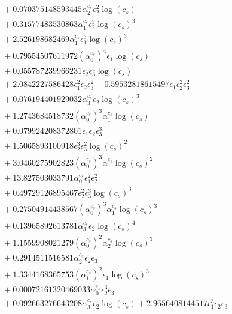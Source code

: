 \documentclass[10pt]{article}
\begin{document}
\begin{align*}
&{}  + 0.070375148593445 \alpha_{2}^{c_s} \epsilon_{2}^{2} \log{\left(c_{s} \right)} \\
&{}  + 0.31577483530863 \alpha_{1}^{c_s} \epsilon_{2}^{3} \log{\left(c_{s} \right)}^{3} \\
&{}  + 2.526198682469 \alpha_{1}^{c_s} \epsilon_{1}^{3} \log{\left(c_{s} \right)}^{3} \\
&{}  + 0.79554507611972 \left(\alpha_{0}^{c_s}\right)^{4} \epsilon_{1} \log{\left(c_{s} \right)} \\
&{}  + 0.055787239966231 \epsilon_{2} \epsilon_{3}^{4} \log{\left(c_{s} \right)} \\
&{}  + 2.0842227586428 \epsilon_{1}^{2} \epsilon_{2} \epsilon_{3}^{2} + 0.59532818615497 \epsilon_{1} \epsilon_{2}^{2} \epsilon_{3}^{2} \\
&{}  + 0.076194401929032 \alpha_{3}^{c_s} \epsilon_{2} \log{\left(c_{s} \right)}^{3} \\
&{}  + 1.2743684518732 \left(\alpha_{0}^{c_s}\right)^{3} \alpha_{1}^{c_s} \log{\left(c_{s} \right)} \\
&{}  + 0.079924208372801 \epsilon_{1} \epsilon_{2} \epsilon_{3}^{3} \\
&{}  + 1.5065893100918 \epsilon_{2}^{3} \epsilon_{3}^{2} \log{\left(c_{s} \right)}^{2} \\
&{}  + 3.0460275902823 \left(\alpha_{0}^{c_s}\right)^{3} \alpha_{1}^{c_s} \log{\left(c_{s} \right)}^{2} \\
&{}  + 13.827503033791 \alpha_{0}^{c_s} \epsilon_{1}^{2} \epsilon_{2}^{2} \\
&{}  + 0.49729126895467 \epsilon_{2}^{2} \epsilon_{3}^{3} \log{\left(c_{s} \right)}^{3} \\
&{}  + 0.27504914438567 \left(\alpha_{0}^{c_s}\right)^{3} \alpha_{1}^{c_s} \log{\left(c_{s} \right)}^{3} \\
&{}  + 0.13965892613781 \alpha_{3}^{c_s} \epsilon_{2} \log{\left(c_{s} \right)}^{4} \\
&{}  + 1.1559908021279 \left(\alpha_{0}^{c_s}\right)^{2} \alpha_{2}^{c_s} \log{\left(c_{s} \right)}^{3} \\
&{}  + 0.2914511516581 \alpha_{2}^{c_s} \epsilon_{2} \epsilon_{3} \\
&{}  + 1.3344168365753 \left(\alpha_{1}^{c_s}\right)^{2} \epsilon_{1} \log{\left(c_{s} \right)}^{3} \\
&{}  + 0.00072161320469033 \alpha_{0}^{c_s} \epsilon_{2}^{3} \epsilon_{3} \\
&{}  + 0.092663276643208 \alpha_{3}^{c_s} \epsilon_{2} \log{\left(c_{s} \right)} + 2.9656408144517 \epsilon_{1}^{3} \epsilon_{2} \epsilon_{3} \\

\end{align*}
\end{document}
